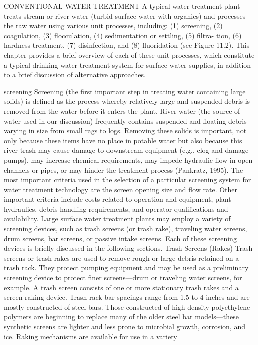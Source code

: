 \documentclass{article}
\begin{document}
CONVENTIONAL WATER TREATMENT A typical water treatment plant treats
stream or river water (turbid surface water with organics) and processes
the raw water using various unit processes, including: (1) screening,
(2) coagulation, (3) flocculation, (4) sedimentation or settling, (5)
filtra- tion, (6) hardness treatment, (7) disinfection, and (8)
fluoridation (see Figure 11.2). This chapter provides a brief overview
of each of these unit processes, which constitute a typical drinking
water treatment system for surface water supplies, in addition to a
brief discussion of alternative approaches.

screening Screening (the first important step in treating water
containing large solids) is defined as the process whereby relatively
large and suspended debris is removed from the water before it enters
the plant. River water (the source of water used in our discussion)
frequently contains suspended and floating debris varying in size from
small rags to logs. Removing these solids is important, not only because
these items have no place in potable water but also because this river
trash may cause damage to downstream equipment (e.g., clog and damage
pumps), may increase chemical requirements, may impede hydraulic flow in
open channels or pipes, or may hinder the treatment process (Pankratz,
1995). The most important criteria used in the selection of a particular
screening system for water treatment technology are the screen opening
size and flow rate. Other important criteria include costs related to
operation and equipment, plant hydraulics, debris handling requirements,
and operator qualifications and availability. Large surface water
treatment plants may employ a variety of screening devices, such as
trash screens (or trash rake), traveling water screens, drum screens,
bar screens, or passive intake screens. Each of these screening devices
is briefly discussed in the following sections. Trash Screens (Rakes)
Trash screens or trash rakes are used to remove rough or large debris
retained on a trash rack. They protect pumping equipment and may be used
as a preliminary screening device to protect finer screens---drum or
traveling water screens, for example. A trash screen consists of one or
more stationary trash rakes and a screen raking device. Trash rack bar
spacings range from 1.5 to 4 inches and are mostly constructed of steel
bars. Those constructed of high-density polyethylene polymers are
beginning to replace many of the older steel bar models---these
synthetic screens are lighter and less prone to microbial growth,
corrosion, and ice. Raking mechanisms are available for use in a variety
\end{document}

